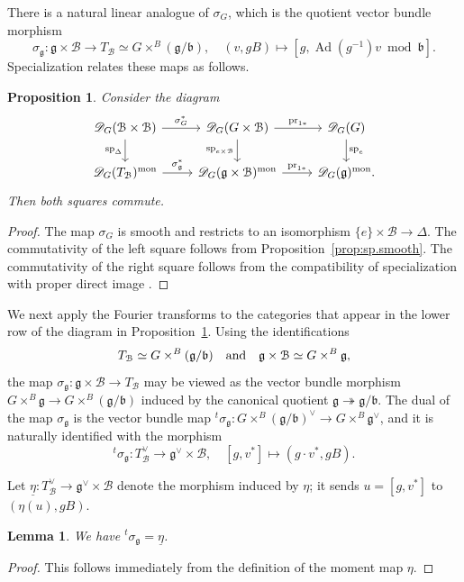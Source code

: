 \documentclass[11pt]{amsart}
\numberwithin{equation}{section}
\newtheorem{proposition}[theorem]{Proposition}
\newtheorem{lemma}[theorem]{Lemma}
\theoremstyle{definition}
\def\and{\quad{\rm and}\quad}
\def\lra{\longrightarrow }
\DeclareMathOperator{\Ad}{\mathrm{Ad}}
\def\sp{\mathrm{sp}}
\DeclareMathOperator{\mon}{mon}
\def\cB{\mathcal {B}}
\def\fg{\mathfrak {g}}
\def\fb{\mathfrak {b}}
\def\pr{\mathrm{pr}}
\begin{document}
 
There is a natural linear analogue of $\sigma_G$, which is the quotient vector bundle morphism
\[\sigma_{\fg}:\fg\times \cB\lra T_{\cB}\simeq G\times^B(\fg/\fb), \quad (v,gB)\mapsto [g,\Ad(g^{-1})v \bmod \fb].\]
Specialization relates these maps as follows.

\begin{proposition}\label{prop:lus.hess}
Consider the diagram
\[
\begin{tikzcd}
\mathscr D_G(\cB\times \cB)\arrow[r,"\sigma_G^*"]\arrow[d,"\sp_\Delta"']&
\mathscr D_G(G\times \cB)\arrow[r,"\pr_{1*}"]\arrow[d,"\sp_{e\times \cB}"']&
\mathscr D_G(G)\arrow[d,"\sp_e"]\\
\mathscr D_{G}(T_{\cB})^{\mon}\arrow[r,"\sigma_{\fg}^*"]&
\mathscr D_{G}(\fg\times \cB)^{\mon}\arrow[r,"\pr_{1*}"]&
\mathscr D_{G}(\fg)^{\mon}.
\end{tikzcd}
\]
Then both squares commute.
\end{proposition}

\begin{proof}
The map $\sigma_G$ is smooth and restricts to an isomorphism $\{e\}\times \cB \to \Delta$.
The commutativity of the left square follows from Proposition~\ref{prop:sp.smooth}.
The commutativity of the right square follows from the compatibility of specialization with proper direct image \cite[(SP2)]{verdier}.
\end{proof}
We next apply the Fourier transforms to the categories that appear in the lower row of the diagram in Proposition~\ref{prop:lus.hess}.
Using the identifications 
\[T_{\cB}\simeq G\times^B(\fg/\fb) \and \fg\times \cB\simeq G\times^B \fg,\] the map $\sigma_{\fg}:\fg\times \cB\to T_\cB$ may be viewed as the vector bundle morphism 
$G\times^B\fg\to G\times^B(\fg/\fb)$
induced by the canonical quotient $\fg\twoheadrightarrow \fg/\fb$.
The dual of the map $\sigma_{\fg}$ is the vector bundle map
${}^t\sigma_\fg:G\times^B(\fg/\fb)^\vee \to G\times^B\fg^\vee$, and it is naturally identified with the morphism
\[{}^t\sigma_\fg:T_\cB^\vee\lra  \fg^\vee\times \cB, \quad [g,v^*]\mapsto (g\cdot v^*,gB).\]

Let $\underline \eta: T_\cB^\vee\to \fg^\vee\times \cB$ denote the morphism induced by $\eta$; it sends $u=[g,v^*]$ to $(\eta(u),gB)$.
\begin{lemma}\label{lem:dual}
We have ${}^t\sigma_\fg=\underline \eta$.
\end{lemma}
\begin{proof}
	This follows immediately from the definition of the moment map $\eta$. 
\end{proof}
\end{document}
